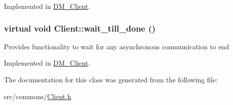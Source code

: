Implemented in \hyperlink{class_d_m___client_a93c89b66097d58302c1322918ec76fca}{DM\_\-Client}.

\hypertarget{class_client_a7cc1fed7f1d161586a8abef93a24b715}{
\subsubsection[{wait\_\-till\_\-done}]{\setlength{\rightskip}{0pt plus 5cm}virtual void Client::wait\_\-till\_\-done ()}}
\label{class_client_a7cc1fed7f1d161586a8abef93a24b715}
Provides functionality to wait for any asynchronous communication to end 

Implemented in \hyperlink{class_d_m___client_a2ea7e411fb8e92febc74c90b8ab886c6}{DM\_\-Client}.



The documentation for this class was generated from the following file:\begin{DoxyCompactItemize}
\item 
src/commons/\hyperlink{_client_8h}{Client.h}\end{DoxyCompactItemize}
